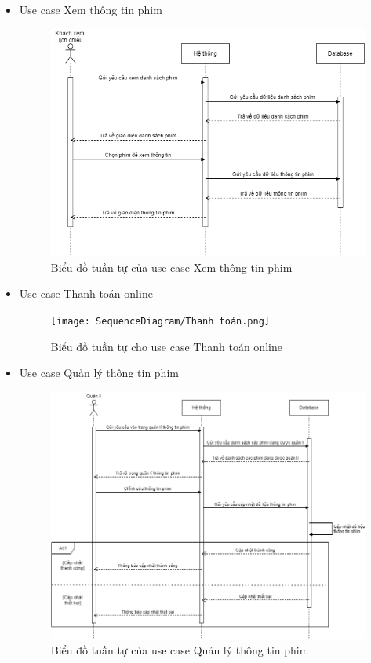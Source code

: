 \documentclass[a4paper, 12pt]{article}
\begin{document}
\begin{itemize}
        \item Use case Xem thông tin phim
        \begin{figure}[H]
            \includegraphics[scale = 0.7]{SequenceDiagram/Khách_Xem thông tin phim.png}
            \caption{Biểu đồ tuần tự của use case Xem thông tin phim}
        \end{figure}
        
        \item Use case Thanh toán online
        \begin{figure}[H]
            \texttt{[image: SequenceDiagram/Thanh toán.png]}
            \caption{Biểu đồ tuần tự cho use case Thanh toán online}
        \end{figure}
        
        \item Use case Quản lý thông tin phim
        \begin{figure}[H]
            \includegraphics[scale = 0.65]{SequenceDiagram/Quản lí_Thông tin phim.png}
            \caption{Biểu đồ tuần tự của use case Quản lý thông tin phim}
        \end{figure}
    \end{itemize}
    \clearpage
\end{document}
